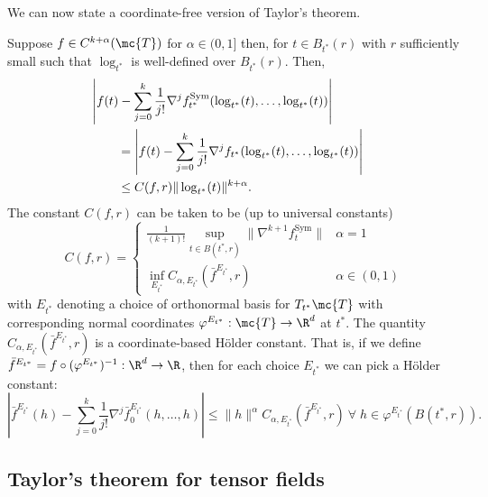 \documentclass{article}
\begin{document}
We can now state a coordinate-free version of Taylor's theorem.
\begin{theorem}
\label{thm:taylor}
  Suppose $f \in C^{k+\alpha}(\mc{T})$ for $\alpha \in (0, 1]$ then, for $t \in B_{t^*}(r)$ with $r$ sufficiently small such that $\log_{t^*}$ is well-defined
    over $B_{t^*}(r)$. Then,
  \begin{equation}
    \label{eq:taylor:theorem}
\begin{aligned}
  \lefteqn{    \left|f(t) - \sum_{j=0}^k \frac{1}{j!} \nabla^j f^{\mathrm{Sym}}_{t^*}(\log_{t^*}(t), \dots, \log_{t^*}(t)) \right| } \\
  & \qquad =     \left|f(t) - \sum_{j=0}^k \frac{1}{j!} \nabla^j f_{t^*}(\log_{t^*}(t), \dots, \log_{t^*}(t)) \right| \\
  & \qquad \leq C(f,r) \|\log_{t^*}(t)\|^{k+\alpha}.
\end{aligned}
    \end{equation}
The constant $C(f, r)$ can be taken to be (up to universal constants)
\begin{equation}
  C(f,r) = \begin{cases} \frac{1}{(k+1)!}\sup_{t \in B(t^*,r)} \|\nabla^{k+1} f^{\mathrm{Sym}}_t\| & \alpha=1 \\
    \inf_{E_{t^*}}  C_{\alpha,E_{t^*}}(\bar{f}^{E_{t^*}}, r) & \alpha \in (0, 1)
\end{cases}
\end{equation}
  with $E_{t^*}$ denoting a choice of orthonormal basis for $T_{t^*}\mc{T}$ with corresponding
  normal coordinates $\varphi^{E_{t^*}}:\mc{T} \rightarrow \R^d$ at $t^*$. The quantity $C_{\alpha,E_{t^*}}(\bar{f}^{E_{t^*}}, r)$ is a coordinate-based H\"older constant.
  That is, if we define $\bar{f}^{E_{t^*}} = f\circ (\varphi^{E_{t^*}})^{-1}: \R^d \rightarrow \R$, then for each choice $E_{t^*}$ we can pick a H\"older constant:
  $$
\left| \bar{f}^{E_{t^*}}(h) - \sum_{j=0}^k \frac{1}{j!} \nabla^j \bar{f}^{E_{t^*}}_0(h, \dots, h) \right| \leq \|h\|^{\alpha} C_{\alpha, E_{t^*}}(\bar{f}^{E_{t^*}}, r) \ \forall \; h \in \varphi^{E_{t^*}}(B(t^*,r)).
  $$
  \end{theorem}

\subsection{Taylor's theorem for tensor fields}
\end{document}
